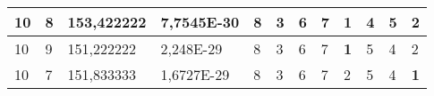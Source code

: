 \documentclass[conference]{IEEEtran}
\begin{document}
\begin{table*}[]
\begin{tabular}{|llll|llllllll|}
\multicolumn{1}{|l|}{10}                                                    & \multicolumn{1}{l|}{8}                                                        & \multicolumn{1}{l|}{153,422222}                                                   & 7,7545E-30                     & \multicolumn{1}{l|}{8}                                                  & \multicolumn{1}{l|}{3}                                                  & \multicolumn{1}{l|}{6}                                                  & \multicolumn{1}{l|}{7}                                                  & \multicolumn{1}{l|}{\textbf{1}}                                         & \multicolumn{1}{l|}{4}                                                  & \multicolumn{1}{l|}{5}                                                  & 2                          \\ \hline
\multicolumn{1}{|l|}{10}                                                    & \multicolumn{1}{l|}{9}                                                        & \multicolumn{1}{l|}{151,222222}                                                   & 2,248E-29                      & \multicolumn{1}{l|}{8}                                                  & \multicolumn{1}{l|}{3}                                                  & \multicolumn{1}{l|}{6}                                                  & \multicolumn{1}{l|}{7}                                                  & \multicolumn{1}{l|}{\textbf{1}}                                         & \multicolumn{1}{l|}{5}                                                  & \multicolumn{1}{l|}{4}                                                  & 2                          \\ \hline
\multicolumn{1}{|l|}{10}                                                    & \multicolumn{1}{l|}{7}                                                        & \multicolumn{1}{l|}{151,833333}                                                   & 1,6727E-29                     & \multicolumn{1}{l|}{8}                                                  & \multicolumn{1}{l|}{3}                                                  & \multicolumn{1}{l|}{6}                                                  & \multicolumn{1}{l|}{7}                                                  & \multicolumn{1}{l|}{2}                                                  & \multicolumn{1}{l|}{5}                                                  & \multicolumn{1}{l|}{4}                                                  & \textbf{1}                 \\ \hline

\end{tabular}
\end{table*}
\end{document}
